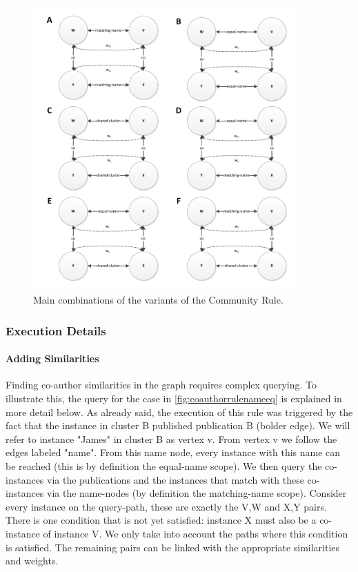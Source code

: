 \begin{figure}[h!]
	\centering
		\includegraphics[width=0.9\textwidth]{fig/coauthorrulecases}
	\caption{Main combinations of the variants of the Community Rule.}
	\label{fig:coauthorrulecases}
\end{figure}

\subsubsection{Execution Details}

\paragraph{Adding Similarities} Finding co-author similarities in the graph requires complex querying. To illustrate this, the query for the case in \autoref{fig:coauthorrulenameeq} is explained in more detail below. As already said, the execution of this rule was triggered by the fact that the instance in cluster B published publication B (bolder edge). We will refer to instance "James" in cluster B as vertex v. From vertex v we follow the edges labeled "name". From this name node, every instance with this name can be reached (this is by definition the equal-name scope). We then query the co-instances via the publications and the instances that match with these co-instances via the name-nodes (by definition the matching-name scope). Consider every instance on the query-path, these are exactly the V,W and X,Y pairs. There is one condition that is not yet satisfied: instance X must also be a co-instance of instance V. We only take into account the paths where this condition is satisfied. The remaining pairs can be linked with the appropriate similarities and weights.

